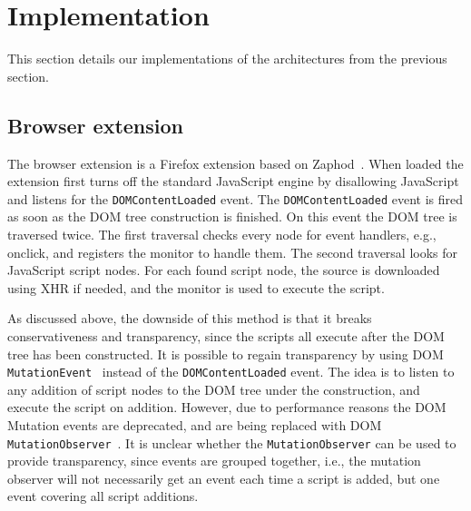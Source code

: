 \documentclass{llncs}
\newcommand{\todo}[1]{\colorbox{red}{\textcolor{white}{\sffamily\bfseries\scriptsize TODO}} \textcolor{red}{#1} \textcolor{red}{$\blacktriangleleft$}}
\begin{document}
\section{Implementation}
\label{sec:impl}

This section details our implementations of the architectures
from the previous section. 


\subsection{Browser extension}

The browser extension is a Firefox extension based on Zaphod~\cite{Zaphod}.
When loaded the extension first turns off the standard JavaScript engine by
disallowing JavaScript and listens for the \lstinline{DOMContentLoaded} event.  The
\lstinline{DOMContentLoaded} event is fired as soon as the DOM tree construction is
finished.  On this event the DOM tree is traversed twice. The first traversal
checks every node for event handlers, e.g., onclick, and registers the monitor
to handle them. The second traversal looks for JavaScript script nodes.  For
each found script node, the source is downloaded using XHR if needed, and the
monitor is used to execute the script.

As discussed above, the downside of this method is that it breaks
conservativeness and transparency, since the scripts all execute after the DOM
tree has been constructed. It is possible to regain transparency by using DOM
\lstinline{MutationEvent}~\cite{DOM3Event} instead of the \lstinline{DOMContentLoaded} event.  The idea is to listen
to any addition of script nodes to the DOM tree under the construction, and
execute the script on addition.  However, due to performance reasons the DOM
Mutation events are deprecated, and are being replaced with DOM \lstinline{MutationObserver}~\cite{DOM4}. 
It is unclear whether the \lstinline{MutationObserver} can be used to
provide transparency, since events are grouped together, i.e., the mutation
observer will not necessarily get an event each time a script is added, but one
event covering all script additions.
\end{document}
